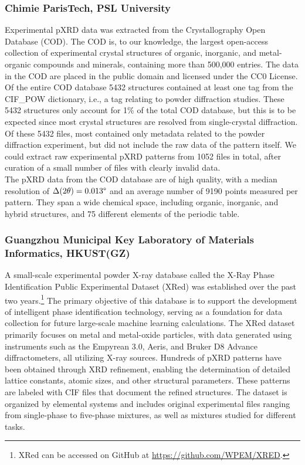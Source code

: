 \pagebreak

\subsubsection*{Chimie ParisTech, PSL University}

Experimental pXRD data was extracted from the Crystallography Open Database (COD)\cite{Grazulis2009, Vaitkus2023}. The COD is, to our knowledge, the largest open-access collection of experimental crystal structures of organic, inorganic, and metal-organic compounds and minerals, containing more than 500,000 entries. The data in the COD are placed in the public domain and licensed under the CC0 License. Of the entire COD database 5432 structures contained at least one tag from the {CIF\_POW} dictionary, i.e., a tag relating to powder diffraction studies. These 5432 structures only account for 1\% of the total COD database, but this is to be expected since most crystal structures are resolved from single-crystal diffraction. Of these 5432 files, most contained only metadata related to the powder diffraction experiment, but did not include the raw data of the pattern itself. We could extract raw experimental pXRD patterns from 1052 files in total, after curation of a small number of files with clearly invalid data. \\

The pXRD data from the COD database are of high quality, with a median resolution of $\Delta(2\theta) = 0.013\degree$ and an average number of 9190 points measured per pattern. They span a wide chemical space, including organic, inorganic, and hybrid structures, and 75 different elements of the periodic table.

\subsubsection*{Guangzhou Municipal Key Laboratory of Materials Informatics, HKUST(GZ)}

A small-scale experimental powder X-ray database called the X-Ray Phase Identification Public Experimental Dataset (XRed) was established over the past two years.\footnote{XRed can be accessed on GitHub at \url{https://github.com/WPEM/XRED}.} The primary objective of this database is to support the development of intelligent phase identification technology, serving as a foundation for data collection for future large-scale machine learning calculations. The XRed dataset primarily focuses on metal and metal-oxide particles, with data generated using instruments such as the Empyrean 3.0, Aeris, and Bruker D8 Advance diffractometers, all utilizing  X-ray sources. Hundreds of pXRD patterns have been obtained through XRD refinement, enabling the determination of detailed lattice constants, atomic sizes, and other structural parameters. These patterns are labeled with CIF files that document the refined structures. The dataset is organized by elemental systems and includes original experimental files ranging from single-phase to five-phase mixtures, as well as mixtures studied for different tasks. \\

